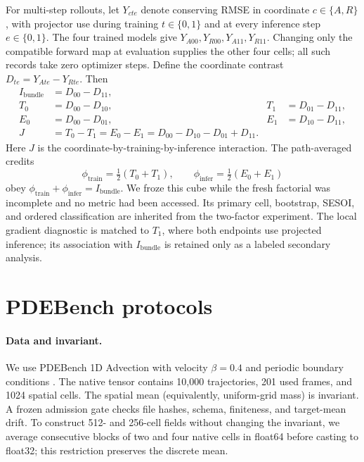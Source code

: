 \documentclass{article}
\begin{document}
For multi-step rollouts, let $Y_{cte}$ denote conserving RMSE in coordinate $c\in\{A,R\}$, with
projector use during training $t\in\{0,1\}$ and at every inference step $e\in\{0,1\}$. The four
trained models give $Y_{A00},Y_{R00},Y_{A11},Y_{R11}$. Changing only the compatible forward map at
evaluation supplies the other four cells; all such records take zero optimizer steps. Define the
coordinate contrast $D_{te}=Y_{Ate}-Y_{Rte}$. Then
\begin{align}
  I_{\mathrm{bundle}} &=D_{00}-D_{11},\\
  T_0&=D_{00}-D_{10}, & T_1&=D_{01}-D_{11},\\
  E_0&=D_{00}-D_{01}, & E_1&=D_{10}-D_{11},\\
  J&=T_0-T_1=E_0-E_1=D_{00}-D_{10}-D_{01}+D_{11}.
\end{align}
Here $J$ is the coordinate-by-training-by-inference interaction. The path-averaged credits
\begin{equation}
  \phi_{\mathrm{train}}=\tfrac12(T_0+T_1),\qquad
  \phi_{\mathrm{infer}}=\tfrac12(E_0+E_1)
\end{equation}
obey $\phi_{\mathrm{train}}+\phi_{\mathrm{infer}}=I_{\mathrm{bundle}}$. We froze this cube while
the fresh factorial was incomplete and no metric had been accessed. Its primary cell, bootstrap,
SESOI, and ordered classification are inherited from the two-factor experiment. The local gradient
diagnostic is matched to $T_1$, where both endpoints use projected inference; its association with
$I_{\mathrm{bundle}}$ is retained only as a labeled secondary analysis.

\section{PDEBench protocols}
\label{sec:protocol}

\paragraph{Data and invariant.}
We use PDEBench 1D Advection with velocity $\beta=0.4$ and periodic boundary conditions
\citep{pdebench,pdebenchdata}. The native tensor contains 10,000 trajectories, 201 used frames,
and 1024 spatial cells. The spatial mean (equivalently, uniform-grid mass) is invariant. A frozen
admission gate checks file hashes, schema, finiteness, and target-mean drift. To construct 512- and
256-cell fields without changing the invariant, we average consecutive blocks of two and four
native cells in float64 before casting to float32; this restriction preserves the discrete mean.
\end{document}
